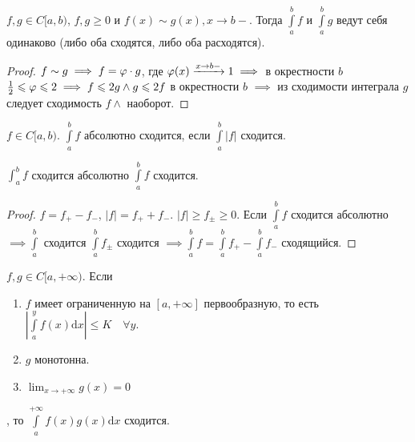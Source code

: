 \begin{consequence}
    $f, g \in C[a, b)$,  $f, g \ge 0$ и $f(x) \sim g(x), x \to b-$. Тогда  $\int\limits_a^b f$ и  $\int\limits_a^b g$ ведут себя одинаково (либо оба сходятся, либо оба расходятся).
\end{consequence}
\begin{proof}
    $f \sim g \implies f = \varphi \cdot g$, где  $\varphi(x) \xrightarrow{x \to b-} 1 \implies$ в окрестности $b$  $\frac{1}{2} \leqslant \varphi \leqslant 2 \implies f \leqslant 2g \land g \leqslant 2f$ в окрестности $b$  $\implies$ из сходимости интеграла  $g$ следует сходимость $f \land$ наоборот. 
\end{proof}

\begin{definition}
    $f \in C[a, b)$. $\int\limits_a^b f$ абсолютно сходится, если  $\int\limits_a^b |f|$ сходится.
\end{definition}
\begin{theorem}
    $\int_a^b f$ сходится абсолютно  $\int\limits_a^b f$ сходится.
\end{theorem}
\begin{proof}
    $f = f_+ - f_-$,  $|f| = f_+ + f_-$.  $|f| \ge f_\pm \ge 0$. Если $\int\limits_a^b f$ сходится абсолютно  $\implies \int\limits_a^b$ сходится  $\int\limits_a^b f_{\pm}$ сходится  $\implies \int\limits_a^b f = \int\limits_a^b f_+ - \int\limits_a^b f_-$ сходящийся.
\end{proof}
\begin{theorem}
    $f, g \in C[a, +\infty)$. Если
    \begin{enumerate}
        \item $f$ имеет ограниченную на  $[a, +\infty]$ первообразную, то есть  $\left| \int\limits_a^y f(x) \mathrm{d}x \right| \le K \quad \forall y$.
        \item $g$ монотонна.
        \item  $\lim_{x \to +\infty} g(x) = 0$
    \end{enumerate}, то $\int\limits_a^{+\infty} f(x)g(x) \mathrm{d}x$ сходится.
\end{theorem}
